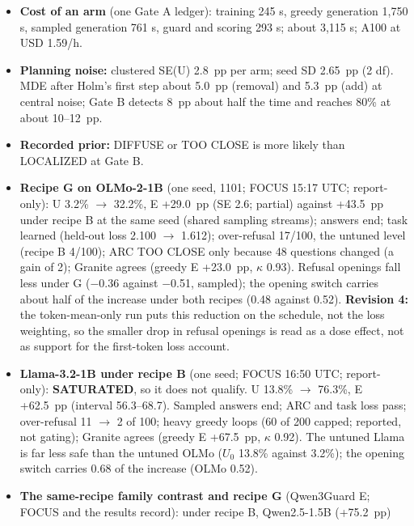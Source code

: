 \documentclass{article}
\theoremstyle{plain}
\theoremstyle{definition}
\theoremstyle{remark}
\begin{document}
\begin{itemize}
        base-model positive control: a classifier-targeted rewrite cut sampled
        unsafe answers from 80.3\% to 11.4\%, but XSTest-safe refusals rose from
        1/50 to 22/50 in both seeds.
  \item \textbf{Cost of an arm} (one Gate A ledger): training 245 s, greedy
        generation 1,750 s, sampled generation 761 s, guard and scoring 293 s;
        about 3,115 s; A100 at USD 1.59/h.
  \item \textbf{Planning noise:} clustered SE(U) 2.8~pp per arm; seed SD 2.65~pp
        (2 df). MDE after Holm's first step about 5.0~pp (removal) and 5.3~pp
        (add) at central noise; Gate B detects 8~pp about half the time and
        reaches 80\% at about 10--12~pp.
  \item \textbf{Recorded prior:} DIFFUSE or TOO CLOSE is more likely than
        LOCALIZED at Gate B.
  \item \textbf{Recipe G on OLMo-2-1B} (one seed, 1101; FOCUS 15:17 UTC;
        report-only): U 3.2\% $\to$ 32.2\%, E +29.0~pp (SE 2.6; partial) against
        +43.5~pp under recipe B at the same seed (shared sampling streams);
        answers end; task learned (held-out loss 2.100 $\to$ 1.612);
        over-refusal 17/100, the untuned level (recipe B 4/100); ARC TOO CLOSE
        only because 48 questions changed (a gain of 2); Granite agrees (greedy
        E +23.0~pp, $\kappa$ 0.93). Refusal openings fall less under G ($-$0.36
        against $-$0.51, sampled); the opening switch carries about half of the
        increase under both recipes (0.48 against 0.52). \textbf{Revision 4:}
        the token-mean-only run puts this reduction on the schedule, not the
        loss weighting, so the smaller drop in refusal openings is read as a
        dose effect, not as support for the first-token loss account.
  \item \textbf{Llama-3.2-1B under recipe B} (one seed; FOCUS 16:50 UTC;
        report-only): \textbf{SATURATED}, so it does not qualify. U 13.8\% $\to$
        76.3\%, E +62.5~pp (interval 56.3--68.7). Sampled answers end; ARC and
        task loss pass; over-refusal 11 $\to$ 2 of 100; heavy greedy loops (60
        of 200 capped; reported, not gating); Granite agrees (greedy E +67.5~pp,
        $\kappa$ 0.92). The untuned Llama is far less safe than the untuned OLMo
        ($U_{0}$ 13.8\% against 3.2\%); the opening switch carries 0.68 of the
        increase (OLMo 0.52).
  \item \textbf{The same-recipe family contrast and recipe G} (Qwen3Guard E;
        FOCUS and the results record): under recipe B, Qwen2.5-1.5B (+75.2~pp)

\end{itemize}
\end{document}
